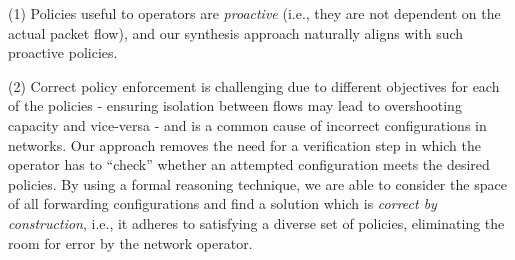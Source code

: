 (1)
Policies useful to operators are \emph{proactive} (i.e., they are not
dependent on the actual packet flow), and our synthesis approach
naturally aligns with such proactive policies.


(2) Correct policy enforcement is challenging due to different
objectives for each of the policies - ensuring isolation between flows
may lead to overshooting capacity and vice-versa - and is a common
cause of incorrect configurations in networks.  Our approach removes
the need for a verification step in which the operator has to
``check'' whether an attempted configuration meets the desired
policies.  By using a formal reasoning technique, we are able to
consider the space of all forwarding configurations and find a
solution which is \emph{correct by construction}, i.e., it adheres to
satisfying a diverse set of policies, eliminating the room for error
by the network operator.

